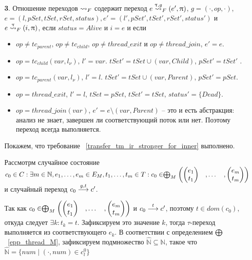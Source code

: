 {\textbf 3.} Отношение переходов $\leadsto_F$ содержит переход $e \stackrel{\uptau, g}{\leadsto}_F (e', \uppi)$, $g=(\cdot,op,\cdot)$, $e = (l, pSet, tSet, rSet, status), e' = (l', pSet', tSet', rSet', status')$ и $e \stackrel{\uptau}{\leadsto}_F (i, \uppi)$, если $status = Alive$ и $i = e$ и если
\begin{itemize}
\item $op \neq tc_{parent}$, $op \neq tc_{child}$, $op \neq thread\_exit$ и $op \neq thread\_join$, $e' = e$.
\item $op=tc_{child}(var, l_\nu)$, $l' = var$. $tSet' = tSet \cup (var, Child)$, $pSet' = tSet'$ .
\item $op=tc_{parent}(var, l_\nu)$, $l' = l$. $tSet' = tSet \cup (var, Parent)$, $pSet' = pSet$.
\item $op=thread\_exit$, $l' = l$, $tSet = pSet$, $tSet' = tSet$, $status' = \{Dead\}$.
\item $op=thread\_join(var)$, $e' = e \setminus (var, Parent)$ -- это и есть абстракция: анализ не знает, завершен ли соответствующий поток или нет. Поэтому переход всегда выполняется.
\end{itemize}

Покажем, что требование ~\ref{transfer_tm_ir_stronger_for_inner} выполнено.

Рассмотрм случайное состояние $c_0 \in C: \exists m \in \mathbb{N}, e_1, \dots, e_m \in E_M, t_1, \dots, t_m \in T: c_0 \in \mathrel{\bigoplus}_M
\begin{pmatrix}
\begin{pmatrix}
e_1 \\
t_1 
\end{pmatrix}& ,
\dots& ,
\begin{pmatrix}
e_m \\
t_m 
\end{pmatrix}
\end{pmatrix}$
и случайный переход $c_0 \stackrel{g,t}{\longrightarrow} c'$.

Так как $c_0 \in \mathrel{\bigoplus}_M
\begin{pmatrix}
\begin{pmatrix}
e_1 \\
t_1 
\end{pmatrix}& ,
\dots& ,
\begin{pmatrix}
e_m \\
t_m 
\end{pmatrix}
\end{pmatrix}$ и $c_0 \stackrel{t}{\longrightarrow} c'$, поэтому $t \in dom(c_0)$, откуда следует $\exists k: t_k = t$. 
Зафиксируем это значение $k$, тогда $\tau$-переход выполняется из соответствующего $e_k$.
В соответствии с определением $\mathrel{\bigoplus}$~\ref{epp_thread_M}, зафиксируем подмножество $\widehat{\mathbb{N}} \subseteq \mathbb{N}$, такое что $\widehat{\mathbb{N}}=\{num \mid (\cdot, num) \in c^0_l\}$


